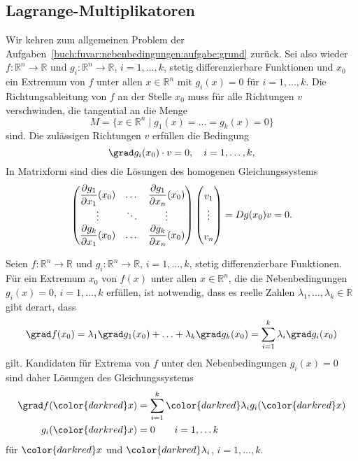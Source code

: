 \subsection{Lagrange-Multiplikatoren}
Wir kehren zum allgemeinen Problem der
Aufgaben~\ref{buch:fuvar:nebenbedingungen:aufgabe:grund}
zurück.
Sei also wieder $f\colon \mathbb{R}^n\to\mathbb{R}$
und
$g_i\colon\mathbb{R}^n\to\mathbb{R}$, $i=1,\dots,k$,
stetig differenzierbare Funktionen und $x_0$ ein Extremum
von $f$ unter allen $x\in\mathbb{R}^n$ mit $g_i(x)=0$ für $i=1,\dots,k$.
Die Richtungsableitung von $f$ an der Stelle $x_0$ muss für alle
Richtungen $v$ verschwinden, die tangential an die Menge
\[
M
=
\{
x\in\mathbb{R}^n
\mid
g_1(x)=\ldots=g_k(x)=0
\}
\]
sind.
Die zulässigen Richtungen $v$ erfüllen die Bedingung
\[
\grad g_i(x_0)\cdot v  = 0,\quad i=1,\dots,k,
\]
In Matrixform sind dies die Lösungen des homogenen Gleichungssystems
\[
{\renewcommand{\arraystretch}{1.2}
\begin{pmatrix}
\displaystyle\frac{\partial g_1}{\partial x_1}(x_0)
&\dots&
\displaystyle\frac{\partial g_1}{\partial x_n}(x_0)
\\
\vdots&\ddots&\vdots\\
\displaystyle\frac{\partial g_k}{\partial x_1}(x_0)
&\dots&
\displaystyle\frac{\partial g_k}{\partial x_n}(x_0)
\end{pmatrix}}
\renewcommand{\arraystretch}{1.7}
\begin{pmatrix}
v_1\\
\vdots\\
v_n
\end{pmatrix}
=
Dg(x_0) v
=
0.
\]

\begin{satz}
\label{buch:fuvar:nebenbedingungen:satz:lm}
Seien $f\colon\mathbb{R}^n\to\mathbb{R}$ und
$g_i\colon\mathbb{R}^n\to\mathbb{R}$, $i=1,\dots,k$, stetig
differenzierbare Funktionen.
Für ein Extremum $x_0$ von $f(x)$ unter allen $x\in\mathbb{R}^n$,
die die Nebenbedingungen $g_i(x)=0$, $i=1,\dots,k$ erfüllen, ist notwendig,
dass es reelle Zahlen $\lambda_1,\dots,\lambda_k\in\mathbb{R}$ gibt derart,
dass
\[
\grad f(x_0)
=
\lambda_1\grad g_1(x_0)
+\ldots+
\lambda_k\grad g_k(x_0)
=
\sum_{i=1}^k \lambda_i \grad g_i(x_0)
\]
gilt.
Kandidaten für Extrema von $f$ unter den Nebenbedingungen $g_i(x)=0$ sind
daher Lösungen des Gleichungssystems
\begin{equation}
\begin{aligned}
\grad f({\color{darkred}x})
&=
\sum_{i=1}^k {\color{darkred}\lambda_i} g_i({\color{darkred}x})
\\
g_i({\color{darkred}x})
&= 
0\qquad i=1,\dots k
\end{aligned}
\label{buch:fuvar:nebenbedingungen:eqn:lm}
\end{equation}
für ${\color{darkred}x}$ und ${\color{darkred}\lambda_i}$, $i=1,\dots,k$.
\end{satz}


